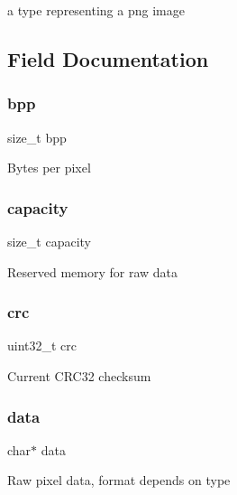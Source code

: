 a type representing a png image 

\subsection{Field Documentation}
\mbox{\label{structpng__t_a1b190a6d9d3ec163d1a9547740e5d6eb}} 
\subsubsection{\texorpdfstring{bpp}{bpp}}
{\footnotesize\ttfamily size\+\_\+t bpp}

Bytes per pixel \mbox{\label{structpng__t_ad721fc6ca6a3d6ba3bc506576622aab0}} 
\subsubsection{\texorpdfstring{capacity}{capacity}}
{\footnotesize\ttfamily size\+\_\+t capacity}

Reserved memory for raw data \mbox{\label{structpng__t_a85b7a7f21b6108b69872839e2509cd67}} 
\subsubsection{\texorpdfstring{crc}{crc}}
{\footnotesize\ttfamily uint32\+\_\+t crc}

Current C\+R\+C32 checksum \mbox{\label{structpng__t_a91a70b77df95bd8b0830b49a094c2acb}} 
\subsubsection{\texorpdfstring{data}{data}}
{\footnotesize\ttfamily char$\ast$ data}

Raw pixel data, format depends on type \mbox{\label{structpng__t_a02afeaaf8574e7a78d6b466ff2695052}} 
